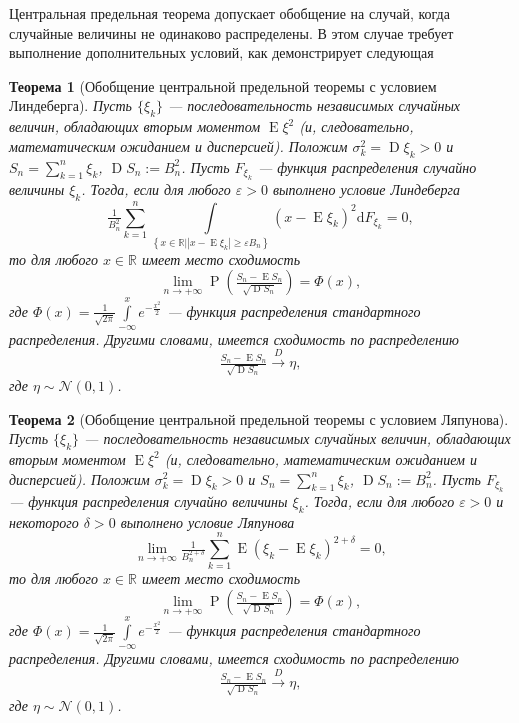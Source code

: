 \documentclass[12pt]{article}
\newtheorem{theorem}{Теорема}
\numberwithin{theorem}{section}
\theoremstyle{definition}
\newcommand{\defin}[2]{\hypertarget{#2}{{\color{red} #1}}}
\newcommand{\RR}{\mathbb{R}}
\newcommand{\prob}{\operatorname{P}}
\newcommand{\expect}{\operatorname{E}}
\newcommand{\disp}{\operatorname{D}}
\newcommand{\diff}{\mathrm{d}}
\newcommand{\defineset}[2]{\left\{
	\left.
	#1
	\right\vert
	#2
	\right\}}
\begin{document}
	Центральная предельная теорема допускает обобщение на случай, 
	когда случайные величины не одинаково распределены.
	В этом случае требует выполнение дополнительных условий,
	как демонстрирует следующая
	
	\begin{theorem}[Обобщение центральной предельной теоремы с условием Линдеберга]
		Пусть $ \{\xi_k\} $ --- последовательность независимых случайных величин,
		обладающих вторым моментом $ \expect\xi^2 $ (и, следовательно, математическим ожиданием и дисперсией).
		Положим $ \sigma_k^2 = \disp\xi_k > 0 $ и $ S_n = \sum\limits_{k = 1}^{n} \xi_k $,
		$ \disp S_n := B_n^2 $. Пусть $ F_{\xi_k} $ --- функция распределения случайно величины $ \xi_k $.
		Тогда, если для любого $ \varepsilon > 0 $ выполнено \defin{условие Линдеберга}{Lindeberg}
		$$ \tfrac{1}{B_n^2} \sum\limits_{k = 1}^{n} 
		\int\limits_{\defineset{x \in \RR}{|x - \expect\xi_k| \geqslant \varepsilon B_n}}
		(x - \expect\xi_k)^2\diff F_{\xi_k} = 0, $$
		то для любого $ x \in \RR $ имеет место сходимость
		$$ \lim\limits_{n \to +\infty} \prob(\tfrac{S_n - \expect S_n}{\sqrt{\disp S_n}}) = \Phi(x), $$
		где $ \Phi(x) = \tfrac{1}{\sqrt{2\pi}}\int\limits_{-\infty}^{x} e^{-\tfrac{x^2}{2}} $
		--- функция распределения стандартного распределения.
		Другими словами, имеется сходимость по распределению
		$$ \tfrac{S_n - \expect S_n}{\sqrt{\disp S_n}} \overset{D}{\to} \eta, $$
		где $ \eta \sim \mathcal{N}(0, 1) $.
	\end{theorem}

	\begin{theorem}[Обобщение центральной предельной теоремы с условием Ляпунова]
		Пусть $ \{\xi_k\} $ --- последовательность независимых случайных величин,
		обладающих вторым моментом $ \expect\xi^2 $ (и, следовательно, математическим ожиданием и дисперсией).
		Положим $ \sigma_k^2 = \disp\xi_k > 0 $ и $ S_n = \sum\limits_{k = 1}^{n} \xi_k $,
		$ \disp S_n := B_n^2 $. Пусть $ F_{\xi_k} $ --- функция распределения случайно величины $ \xi_k $.
		Тогда, если для любого $ \varepsilon > 0 $ и некоторого $ \delta > 0 $ 
		выполнено \defin{условие Ляпунова}{Lyapunov}
		$$ \lim\limits_{n \to +\infty} \tfrac{1}{B_n^{2 + \delta}} 
		\sum\limits_{k = 1}^{n} \expect (\xi_k - \expect\xi_k)^{2 + \delta} = 0, $$
		то для любого $ x \in \RR $ имеет место сходимость
		$$ \lim\limits_{n \to +\infty} \prob(\tfrac{S_n - \expect S_n}{\sqrt{\disp S_n}}) = \Phi(x), $$
		где $ \Phi(x) = \tfrac{1}{\sqrt{2\pi}}\int\limits_{-\infty}^{x} e^{-\tfrac{x^2}{2}} $
		--- функция распределения стандартного распределения.
		Другими словами, имеется сходимость по распределению
		$$ \tfrac{S_n - \expect S_n}{\sqrt{\disp S_n}} \overset{D}{\to} \eta, $$
		где $ \eta \sim \mathcal{N}(0, 1) $.
	\end{theorem}
	
\end{document}
